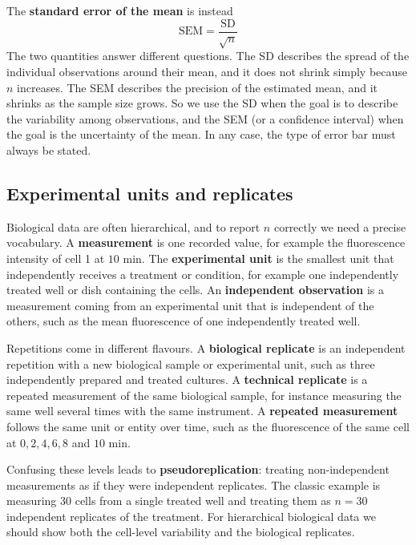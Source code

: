 \documentclass[letterpaper,11pt,leqno]{book}
\begin{document}
The \textbf{standard error of the mean} is instead
\begin{equation}
\boxed{\text{SEM} = \frac{\text{SD}}{\sqrt{n}}}
\label{eq:sem_equation}
\end{equation}
The two quantities answer different questions. The SD describes the spread of the individual observations around their mean, and it does not shrink simply because $n$ increases. The SEM describes the precision of the estimated mean, and it shrinks as the sample size grows. So we use the SD when the goal is to describe the variability among observations, and the SEM (or a confidence interval) when the goal is the uncertainty of the mean. In any case, the type of error bar must always be stated.

\subsection{Experimental units and replicates}
\label{sec:replicates}

Biological data are often hierarchical, and to report $n$ correctly we need a precise vocabulary. A \textbf{measurement} is one recorded value, for example the fluorescence intensity of cell 1 at $10\text{ min}$. The \textbf{experimental unit} is the smallest unit that independently receives a treatment or condition, for example one independently treated well or dish containing the cells. An \textbf{independent observation} is a measurement coming from an experimental unit that is independent of the others, such as the mean fluorescence of one independently treated well.

Repetitions come in different flavours. A \textbf{biological replicate} is an independent repetition with a new biological sample or experimental unit, such as three independently prepared and treated cultures. A \textbf{technical replicate} is a repeated measurement of the same biological sample, for instance measuring the same well several times with the same instrument. A \textbf{repeated measurement} follows the same unit or entity over time, such as the fluorescence of the same cell at $0, 2, 4, 6, 8$ and $10\text{ min}$.

Confusing these levels leads to \textbf{pseudoreplication}: treating non-independent measurements as if they were independent replicates. The classic example is measuring 30 cells from a single treated well and treating them as $n = 30$ independent replicates of the treatment. For hierarchical biological data we should show both the cell-level variability and the biological replicates.
\end{document}
